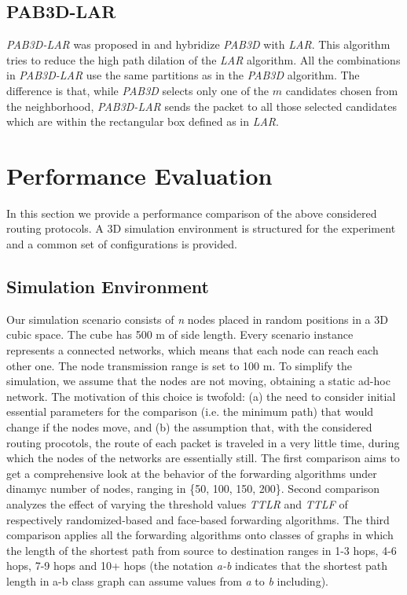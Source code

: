 \documentclass[journal,comsoc]{IEEEtran}
\begin{document}
\subsection{PAB3D-LAR}
\emph{PAB3D-LAR} was proposed in \cite{abdallah:high, abdallah:hybrid} and hybridize \emph{PAB3D} with \emph{LAR}. This algorithm tries to reduce the high path dilation of the \emph{LAR} algorithm. All the combinations in \emph{PAB3D-LAR} use the same partitions as in the \emph{PAB3D} algorithm. The difference is that, while \emph{PAB3D} selects only one of the \(m\) candidates chosen from the neighborhood, \emph{PAB3D-LAR} sends the packet to all those selected candidates which are within the rectangular box defined as in \emph{LAR}.


\section{Performance Evaluation}
In this section we provide a performance comparison of the above considered routing protocols. A 3D simulation environment is structured for the experiment and a common set of configurations is provided.

\subsection{Simulation Environment}
Our simulation scenario consists of \textit{n} nodes placed in random positions in a 3D cubic space. The cube has 500 m of side length. Every scenario instance represents a connected networks, which means that each node can reach each other one. The node transmission range is set to 100 m. To simplify the simulation, we assume that the nodes are not moving, obtaining a static ad-hoc network. The motivation of this choice is twofold: (a) the need to consider initial essential parameters for the comparison (i.e. the minimum path) that would change if the nodes move, and (b) the assumption that, with the considered routing procotols, the route of each packet is traveled in a very little time, during which the nodes of the networks are essentially still. The first comparison aims to get a comprehensive look at the behavior of the forwarding algorithms under dinamyc number of nodes, ranging in \{50, 100, 150, 200\}. Second comparison analyzes the effect of varying the threshold values \emph{TTLR} and \emph{TTLF} of respectively randomized-based and face-based forwarding algorithms. The third comparison applies all the forwarding algorithms onto classes of graphs in which the length of the shortest path from source to destination ranges in 1-3 hops, 4-6 hops, 7-9 hops and 10+ hops (the notation \emph{a-b} indicates that the shortest path length in a-b class graph can assume values from \emph{a} to \emph{b} including).
\end{document}
